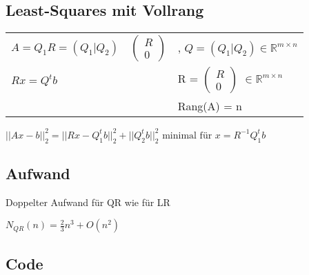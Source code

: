 \documentclass[12pt,a4paper]{article} %
\begin{document}
	\subsection{Least-Squares mit Vollrang}
	
	\begin{tabular}{l l l }
		$A = Q_1R = (Q_1|Q_2)$ &
		$\begin{pmatrix}
			R \\
			0
		\end{pmatrix}$ &
		, $Q = (Q_1|Q_2) \in \mathbb{R}^{m \times n}$ \\
		$Rx = Q^tb$ & & R = 
		$\begin{pmatrix}
			R \\
			0
		\end{pmatrix}$
		$\in \mathbb{R}^{m \times n}$ \\
		& & Rang(A) = n
	\end{tabular}
	
	$||Ax - b||_2^2 = ||Rx - Q_1^tb||_2^2 + ||Q_2^tb||_2^2 \text{ minimal für } x = R^{-1}Q_1^tb$
	
	\subsection{Aufwand}
	
	Doppelter Aufwand für QR wie für LR
	
	$N_{QR}(n) = \frac{2}{3}n^3 + O(n^2)$
	
	\subsection{Code}
	
	
\end{document}
